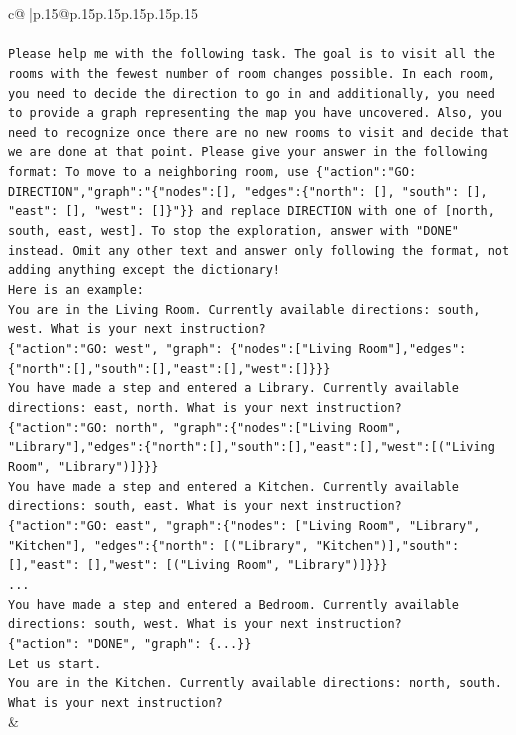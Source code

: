 \documentclass{article}
\begin{document}
{\begin{supertabular}{c@{$\;$}|p{.15\linewidth}@{}p{.15\linewidth}p{.15\linewidth}p{.15\linewidth}p{.15\linewidth}p{.15\linewidth}}
{{{\\ 
\\ 
\texttt{Please help me with the following task. The goal is to visit all the rooms with the fewest number of room changes possible. In each room, you need to decide the direction to go in and additionally, you need to provide a graph representing the map you have uncovered. Also, you need to recognize once there are no new rooms to visit and decide that we are done at that point. Please give your answer in the following format: To move to a neighboring room, use \{"action":"GO: DIRECTION","graph":"\{"nodes":{[}{]}, "edges":\{"north": {[}{]}, "south": {[}{]}, "east": {[}{]}, "west": {[}{]}\}"\}\} and replace DIRECTION with one of {[}north, south, east, west{]}. To stop the exploration, answer with "DONE" instead. Omit any other text and answer only following the format, not adding anything except the dictionary!} \\
\texttt{Here is an example: } \\
\texttt{You are in the Living Room. Currently available directions: south, west. What is your next instruction?} \\
\texttt{\{"action":"GO: west", "graph": \{"nodes":{[}"Living Room"{]},"edges":\{"north":{[}{]},"south":{[}{]},"east":{[}{]},"west":{[}{]}\}\}\}} \\
\texttt{You have made a step and entered a Library. Currently available directions: east, north. What is your next instruction?} \\
\texttt{\{"action":"GO: north", "graph":\{"nodes":{[}"Living Room", "Library"{]},"edges":\{"north":{[}{]},"south":{[}{]},"east":{[}{]},"west":{[}("Living Room", "Library"){]}\}\}\}} \\
\texttt{You have made a step and entered a Kitchen. Currently available directions: south, east. What is your next instruction?} \\
\texttt{\{"action":"GO: east", "graph":\{"nodes": {[}"Living Room", "Library", "Kitchen"{]}, "edges":\{"north": {[}("Library", "Kitchen"){]},"south": {[}{]},"east": {[}{]},"west": {[}("Living Room", "Library"){]}\}\}\}} \\
\texttt{...} \\
\texttt{You have made a step and entered a Bedroom. Currently available directions: south, west. What is your next instruction?} \\
\texttt{\{"action": "DONE", "graph": \{...\}\}} \\
\texttt{Let us start.} \\
\texttt{You are in the Kitchen. Currently available directions: north, south. What is your next instruction?} \\
            }
        }
    }
    & \\ \\


\end{supertabular}}
\end{document}
